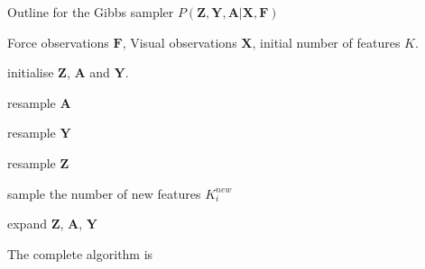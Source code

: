 \documentclass[]{article}
\begin{document}
\begin{algorithm}[H]
	\caption{Outline for the Gibbs sampler $P(\mathbf{Z}, \mathbf{Y}, \mathbf{A} | \mathbf{X}, \mathbf{F})$}
	\begin{algorithmic}[1]
		\REQUIRE Force observations $\mathbf{F}$, Visual observations $\mathbf{X}$, initial number of features $K$.
		\vspace{0.2cm}
		
		\STATE initialise $\mathbf{Z}$, $\mathbf{A}$ and $\mathbf{Y}$.
		\vspace{0.2cm}
		
		\vspace{0.2cm}
		
		\STATE resample $\mathbf{A}$ \\
		\vspace{0.2cm}
		
		\STATE resample $\mathbf{Y}$ \\
		\vspace{0.2cm}
		
		\vspace{0.2cm}
			\STATE resample $\mathbf{Z}$
			\vspace{0.2cm}
		
			\STATE sample the number of new features $K^{new}_i$
			\vspace{0.2cm}
		
				\STATE expand $\mathbf{Z}$, $\mathbf{A}$, $\mathbf{Y}$
				
			\ENDIF
		\vspace{0.2cm}
		
		\ENDFOR
		
		\ENDWHILE
	\end{algorithmic}
	\label{alg:gs}
\end{algorithm}

The complete algorithm is
\end{document}
